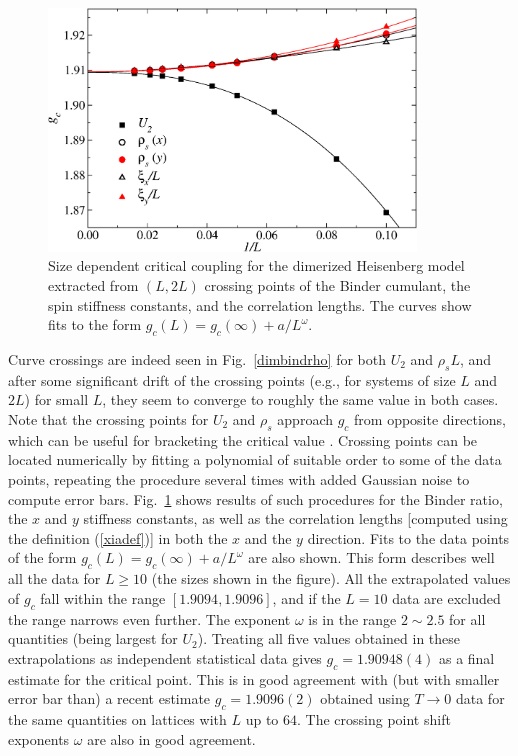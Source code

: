 \documentclass[draft,numberedheadings]{aipproc}
\begin{document}
\begin{figure}
\includegraphics[width=9.75cm, clip]{dimcrossgc.eps}
\caption{Size dependent critical coupling for the dimerized Heisenberg model extracted from $(L,2L)$ crossing points of the Binder cumulant, 
the spin stiffness constants, and the correlation lengths. The curves show fits to the form $g_c(L)=g_c(\infty)+a/L^\omega$.}
\label{dimcrossgc}
\end{figure}

Curve crossings are indeed seen in Fig.~\ref{dimbindrho} for both $U_2$ and $\rho_sL$, and after some significant drift of the crossing points (e.g., for systems 
of size $L$ and $2L$) for small $L$, they seem to converge to roughly the same value in both cases. Note that the crossing points for $U_2$ and $\rho_s$
approach $g_c$ from opposite directions, which can be useful for bracketing the critical value \cite{wang,wenzel1}. Crossing points can be located numerically by 
fitting a polynomial of suitable order to some of the data points, repeating the procedure several times with added Gaussian noise to compute error bars. 
Fig.~\ref{dimcrossgc} shows results of such procedures for the Binder ratio, the $x$ and $y$ stiffness constants, as well as the correlation lengths [computed 
using the definition (\ref{xiadef})] in both the $x$ and the $y$ direction. Fits to the data points of the form $g_c(L)=g_c(\infty)+a/L^\omega$ are also shown. 
This form describes well all the data for $L\ge 10$ (the sizes shown in the figure). All the extrapolated values of $g_c$ fall within the range $[1.9094,1.9096]$, 
and if the $L=10$ data are excluded the range narrows even further. The exponent $\omega$ is in the range $2 \sim 2.5$ for all quantities (being largest
for $U_2$). Treating all five values obtained in these extrapolations as independent statistical data gives $g_c=1.90948(4)$ as a  final estimate for the critical 
point. This is in good agreement with (but with smaller error bar than) a recent estimate $g_c=1.9096(2)$ obtained using $T\to 0$ data for the same quantities 
on lattices with $L$ up to $64$. The crossing point shift exponents $\omega$ are also in good agreement.
\end{document}
